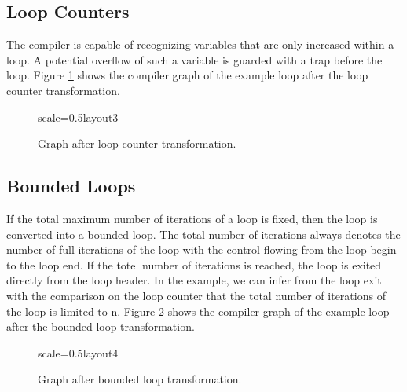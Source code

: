 \documentclass[twocolumn]{svjour3}
\begin{document}
\subsection{Loop Counters}
The compiler is capable of recognizing variables that are only increased within a loop.
A potential overflow of such a variable is guarded with a trap before the loop.
Figure \ref{fig:loop3} shows the compiler graph of the example loop after the loop counter transformation.


\begin{figure}[h]
  \label{fig:loop3}
  \centering
\begin{digraphenv}{scale=0.5}{layout3}
\end{digraphenv}
  \caption{Graph after loop counter transformation.}
\end{figure}

\subsection{Bounded Loops}

If the total maximum number of iterations of a loop is fixed, then the loop is converted into a bounded loop.
The total number of iterations always denotes the number of full iterations of the loop with the control flowing from the loop begin to the loop end.
If the totel number of iterations is reached, the loop is exited directly from the loop header.
In the example, we can infer from the loop exit with the comparison on the loop counter that the total number of iterations of the loop is limited to n.
Figure \ref{fig:loop4} shows the compiler graph of the example loop after the bounded loop transformation.

\begin{figure}[h]
  \label{fig:loop4}
  \centering
\begin{digraphenv}{scale=0.5}{layout4}
\end{digraphenv}
  \caption{Graph after bounded loop transformation.}
\end{figure}
\end{document}

